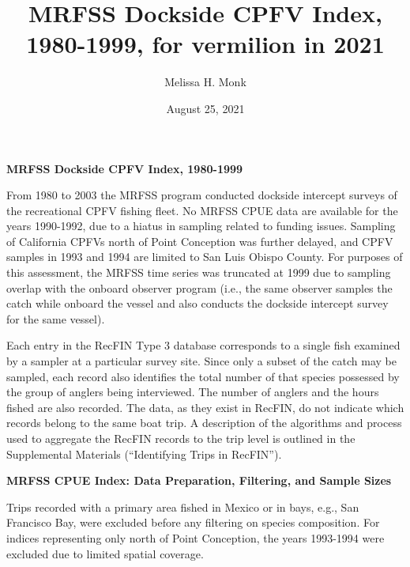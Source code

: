 \documentclass[
]{article}
\title{MRFSS Dockside CPFV Index, 1980-1999, for vermilion in 2021}
\author{Melissa H. Monk}
\date{August 25, 2021}
\begin{document}
\maketitle

{
\setcounter{tocdepth}{2}
\tableofcontents
}
\textbf{MRFSS Dockside CPFV Index, 1980-1999}

From 1980 to 2003 the MRFSS program conducted dockside intercept surveys of the
recreational CPFV fishing fleet. No MRFSS CPUE data are available for the years
1990-1992, due to a hiatus in sampling related to funding issues. Sampling of
California CPFVs north of Point Conception was further delayed, and CPFV samples
in 1993 and 1994 are limited to San Luis Obispo County.
For purposes of this assessment, the MRFSS time series was truncated at 1999 due
to sampling overlap with the
onboard observer program (i.e., the same observer samples the catch while
onboard the vessel and also conducts the dockside intercept survey for
the same vessel).

Each entry in the RecFIN Type 3 database corresponds to a
single fish examined by a sampler at a particular survey site. Since only a
subset of the catch may be sampled, each record also
identifies the total number of that species possessed by the group of anglers
being interviewed. The number of anglers and the hours fished are also recorded.
The data, as they exist in RecFIN, do not indicate which records
belong to the same boat trip. A description of the algorithms and process used to
aggregate the RecFIN records to the trip level is outlined in the Supplemental Materials
(``Identifying Trips in RecFIN'').

\textbf{MRFSS CPUE Index: Data Preparation, Filtering, and Sample Sizes}

Trips recorded with a primary area fished in Mexico or in bays, e.g.,
San Francisco Bay, were excluded before any filtering on species composition.
For indices representing only north of Point Conception, the years 1993-1994 were
excluded due to limited spatial coverage.
\end{document}
